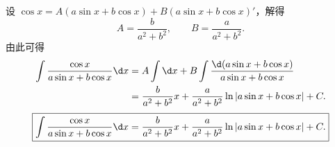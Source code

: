 \begin{solution}
    设 $\cos x = A(a\sin x + b\cos x) + B(a\sin x + b\cos x)'$，解得
    \begin{equation}
        A = \frac{b}{a^2 + b^2}, \qquad B = \frac{a}{a^2 + b^2}.
    \end{equation}
    由此可得
    \begin{equation}
        \begin{aligned}
            \int \frac{\cos x}{a\sin x + b\cos x} \d x & = A\int \d x + B\int \frac{\d(a\sin x + b\cos x)}{a\sin x + b\cos x}    \\
                                                       & = \frac{b}{a^2 + b^2}x + \frac{a}{a^2 + b^2}\ln|a\sin x + b\cos x| + C.
        \end{aligned}
    \end{equation}
    \begin{equation}
        \boxed{\int \frac{\cos x}{a\sin x + b\cos x} \d x = \frac{b}{a^2 + b^2}x + \frac{a}{a^2 + b^2}\ln|a\sin x + b\cos x| + C.}
    \end{equation}
\end{solution}

\endinput
